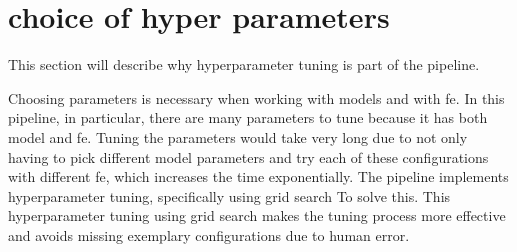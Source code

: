 \section{choice of hyper parameters}
This section will describe why hyperparameter tuning is part of the pipeline. 

Choosing parameters is necessary when working with models and with \gls{fe}. In this pipeline, in particular, there are many parameters to tune because it has both model and \gls{fe}. Tuning the parameters would take very long due to not only having to pick different model parameters and try each of these configurations with different \gls{fe}, which increases the time exponentially. The pipeline implements hyperparameter tuning, specifically using grid search To solve this. This hyperparameter tuning using grid search makes the tuning process more effective and avoids missing exemplary configurations due to human error.